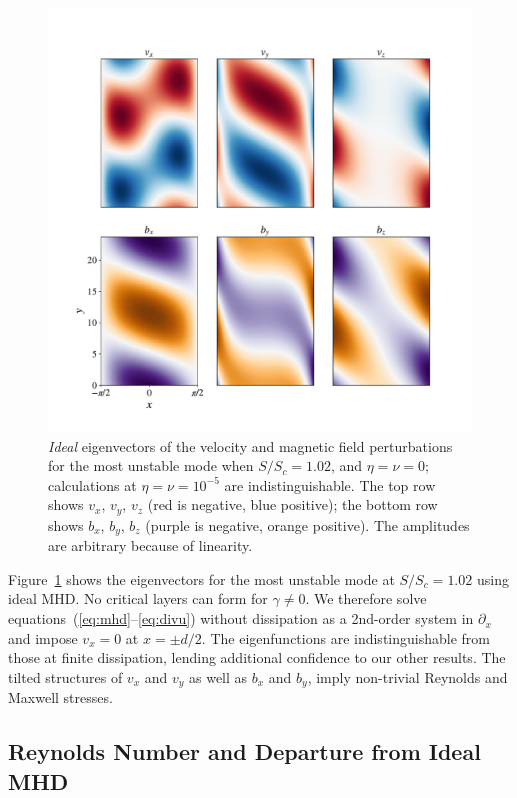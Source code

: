 \documentclass[openacc]{rsproca_new}%
\newcommand{\SSC}{S/S_{c}}
\begin{document}
\begin{figure}[h!]
  \centering
  \includegraphics[width=\columnwidth]{eigvecs_xy_run_11_ideal_single_mode.pdf}
  \caption{\textit{Ideal} eigenvectors of the velocity and magnetic field perturbations for the most unstable mode when $\SSC=1.02$, and $\eta=\nu=0$; calculations at $\eta=\nu=10^{-5}$ are indistinguishable.
  The top row shows $v_{x}$, $v_{y}$, $v_{z}$ (red is negative, blue positive); the bottom row shows $b_{x}$, $b_{y}$, $b_{z}$ (purple is negative, orange positive). 
The amplitudes are arbitrary because of linearity.}
  \label{fig:eigvec}
\end{figure}

Figure~\ref{fig:eigvec} shows the eigenvectors for the most unstable mode at $\SSC=1.02$ using ideal MHD. 
No critical layers can form for $\gamma\ne0$.
We therefore solve equations~(\ref{eq:mhd}--\ref{eq:divu}) without dissipation as a 2nd-order system in $\partial_{x}$ and impose $v_{x}=0$ at $x=\pm{d/2}$.
The eigenfunctions are indistinguishable from those at finite dissipation, lending additional confidence to our other results.
The tilted structures of $v_{x}$ and $v_{y}$ as well as $b_{x}$ and $b_{y}$, imply non-trivial Reynolds and Maxwell stresses.

\subsection{Reynolds Number and Departure from Ideal MHD}
\label{sec:reyn}
\end{document}
